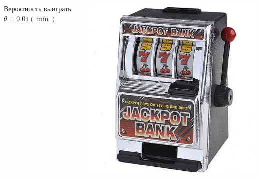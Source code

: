 \documentclass[fullscreen=true, bookmarks=true, hyperref={pdfencoding=unicode}]{beamer}
\begin{document}
\begin{frame}
\begin{columns}
\begin{column}{.25\paperwidth}
\begin{center}
          Вероятность выиграть $\theta = 0.01 (\min)$
        \end{center}
      \end{column}
      \begin{column}{.25\paperwidth}
        \begin{center}
          \includegraphics[keepaspectratio,
                           width=.2\paperwidth]{data-kopilkabandit.jpg}


\end{center}
\end{column}
\end{columns}
\end{frame}
\end{document}
